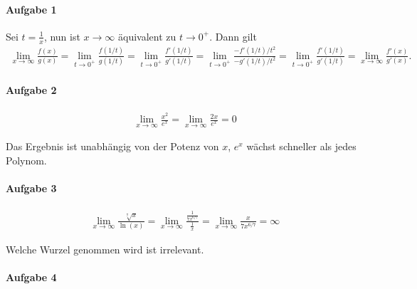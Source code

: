 \documentclass{article}
\begin{document}
\paragraph{Aufgabe 1}


Sei $t = \frac{1}{x}$, nun ist $x \to \infty$ äquivalent zu $t \to 0^+$. Dann gilt
\begin{align*}
    \lim_{x \to \infty} \frac{f(x)}{g(x)} = \lim_{t \to 0^+}\frac{f(1/t)}{g(1/t)} = \lim_{t \to 0^+}\frac{f'(1/t)}{g'(1/t)} = \lim_{t \to 0^+}\frac{-f'(1/t)/t^2}{-g'(1/t)/t^2} = \lim_{t \to 0^+} \frac{f'(1/t)}{g'(1/t)} = \lim_{x \to \infty} \frac{f'(x)}{g'(x)}.
\end{align*}

\paragraph{Aufgabe 2}

\begin{align*}
    \lim_{x \to \infty}\frac{x^2}{e^x} = \lim_{x \to \infty}\frac{2x}{e^x} = 0
\end{align*}

Das Ergebnis ist unabhängig von der Potenz von $x$, $e^x$ wächst schneller als jedes Polynom.

\paragraph{Aufgabe 3}

\begin{align*}
    \lim_{x \to \infty}\frac{\sqrt[7]{x}}{\ln(x)} = \lim_{x \to \infty}\frac{\frac{1}{7x^{6/7}}}{\frac{1}{x}} = \lim_{x \to \infty}\frac{x}{7x^{6/7}} = \infty
\end{align*}

Welche Wurzel genommen wird ist irrelevant.

\paragraph{Aufgabe 4}
\end{document}
